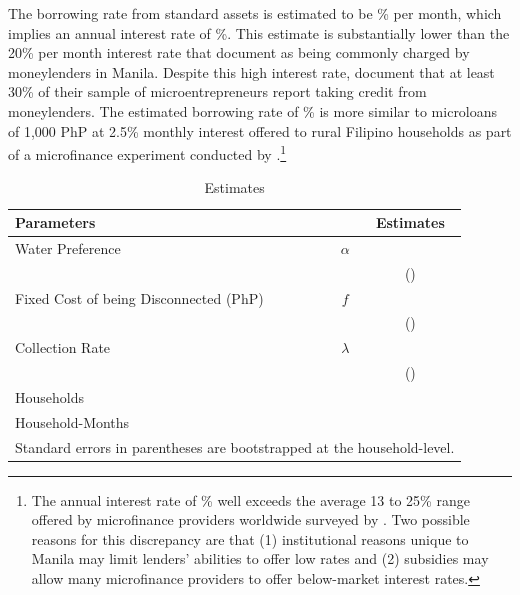 \documentclass[12pt]{article}
\begin{document}
The borrowing rate from standard assets is estimated to be \unskip\% per month, which implies an annual interest rate of \unskip\%.  This estimate is substantially lower than the 20\% per month interest rate that \cite{karlan2009expanding} document as being commonly charged by moneylenders in Manila.  Despite this high interest rate, \cite{karlan2009expanding} document that at least 30\% of their sample of microentrepreneurs report taking credit from moneylenders.  The estimated borrowing rate of \unskip\% is more similar to microloans of 1,000 PhP at 2.5\% monthly interest offered to rural Filipino households as part of a microfinance experiment conducted by \cite{gine2014group}.\footnote{The annual interest rate of \unskip\% well exceeds the average 13 to 25\% range offered by microfinance providers worldwide surveyed by \cite{cull2009microfinance}.  Two possible reasons for this discrepancy are that (1) institutional reasons unique to Manila may limit lenders' abilities to offer low rates and (2) subsidies may allow many microfinance providers to offer below-market interest rates.}

\begin{table}[h!]
\centering
\caption{Estimates}\label{table:estimates}
\vspace{-2mm}
\begin{tabular}{l*{1}{cc}}
\toprule
Parameters  &   & Estimates \\
\midrule
Water Preference & $\alpha$ &  \\
 &  & (\unskip) \\[.4em]
Fixed Cost of being Disconnected (PhP) & $f$ &   \\
 &  &  (\unskip) \\[.4em]
Collection Rate & $\lambda$ &  \\
 &  & (\unskip) \\[.8em]
Households & &  \\
Household-Months & &  \\
\bottomrule
\multicolumn{3}{l}{\scriptsize Standard errors in parentheses are bootstrapped at the household-level.} %
\end{tabular}
\end{table}
\end{document}
